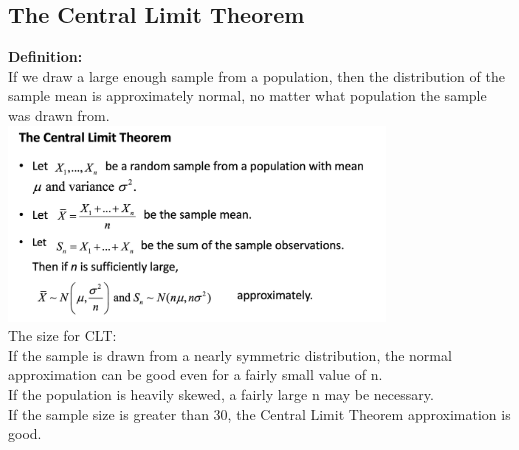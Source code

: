 \documentclass[../main.tex]{subfiles}
\begin{document}
\subsection{The Central Limit Theorem}
\textbf{Definition:}\\
If we draw a large enough sample from a population, then the distribution of the sample mean is approximately normal, no matter what population the sample was drawn from.\\

\includegraphics[width = 10cm]{Sections/Image/CLT.png}
\\
The size for CLT:\\
If the sample is drawn from a nearly symmetric distribution, the normal approximation can be good even for a fairly small value of n.\\ 
If the population is heavily skewed, a fairly large n may be necessary. \\
If the sample size is greater than 30, the Central Limit Theorem approximation is good.
\end{document}
